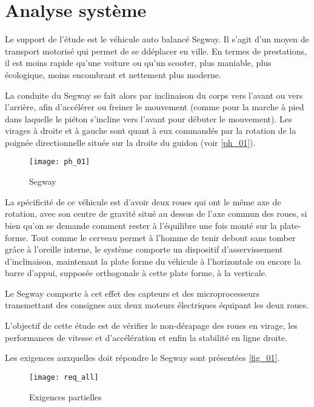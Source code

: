 
\section{Analyse système}

\ifprof
\else
Le support de l’étude est le véhicule auto balancé Segway. Il s’agit d’un moyen de transport motorisé qui permet de se ddéplacer en ville. En termes de prestations, il est moins rapide qu’une voiture ou qu’un scooter, plus maniable, plus écologique, moins encombrant et nettement plus moderne.

La conduite du Segway se fait alors par inclinaison du corps vers l’avant ou vers l’arrière, afin d’accélérer ou freiner le mouvement (comme pour la marche à pied dans laquelle le piéton s’incline vers l’avant pour débuter le mouvement). Les virages à droite et à gauche sont quant à eux commandés par la rotation de la poignée directionnelle située sur la droite du guidon (voir \autoref{ph_01}).

\begin{figure}[H]
\centering
\texttt{[image: ph\_01]}
\caption{Segway \label{ph_01}}
\end{figure}


La spécificité de ce véhicule est d’avoir deux roues qui ont le même axe de rotation, avec son centre de gravité situé au dessus de l’axe commun des roues, si bien qu’on se demande comment rester à l’équilibre une fois monté sur la plate-forme. Tout comme le cerveau permet à l’homme de tenir debout sans tomber grâce à l’oreille interne, le système comporte un dispositif d’asservissement d’inclinaison, maintenant la plate forme du véhicule à l’horizontale ou encore la barre d’appui, supposée orthogonale à cette plate forme, à la verticale.

Le Segway comporte à cet effet des capteurs et des microprocesseurs transmettant des consignes aux deux moteurs électriques équipant les deux roues.
\begin{obj}
L’objectif de cette étude est de vérifier le non-dérapage des roues en virage, les performances de vitesse et d’accélération et enfin la stabilité en ligne droite.
\end{obj}
Les exigences auxquelles doit répondre le Segway sont présentées \autoref{fig_01}.



\begin{figure}[H]
\centering
\texttt{[image: req\_all]}
\caption{Exigences partielles \label{fig_01}}
\end{figure}


